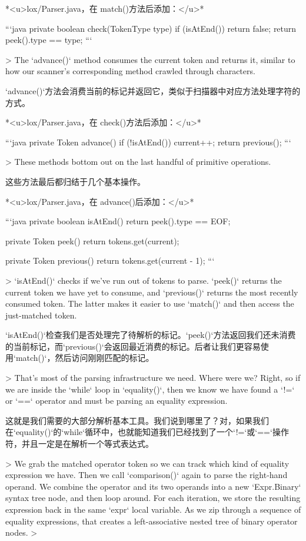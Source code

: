 \documentclass[cn,11pt,chinese]{elegantbook}
\begin{document}
*<u>lox/Parser.java，在 match()方法后添加：</u>*

```java
  private boolean check(TokenType type) {
    if (isAtEnd()) return false;
    return peek().type == type;
  }
```

> The `advance()` method consumes the current token and returns it, similar to how our scanner’s corresponding method crawled through characters.

`advance()`方法会消费当前的标记并返回它，类似于扫描器中对应方法处理字符的方式。

*<u>lox/Parser.java，在 check()方法后添加：</u>*

```java
  private Token advance() {
    if (!isAtEnd()) current++;
    return previous();
  }
```

> These methods bottom out on the last handful of primitive operations.

这些方法最后都归结于几个基本操作。

*<u>lox/Parser.java，在 advance()后添加：</u>*

```java
  private boolean isAtEnd() {
    return peek().type == EOF;
  }

  private Token peek() {
    return tokens.get(current);
  }

  private Token previous() {
    return tokens.get(current - 1);
  }
```

> `isAtEnd()` checks if we’ve run out of tokens to parse. `peek()` returns the current token we have yet to consume, and `previous()` returns the most recently consumed token. The latter makes it easier to use `match()` and then access the just-matched token.

`isAtEnd()`检查我们是否处理完了待解析的标记。`peek()`方法返回我们还未消费的当前标记，而`previous()`会返回最近消费的标记。后者让我们更容易使用`match()`，然后访问刚刚匹配的标记。

> That’s most of the parsing infrastructure we need. Where were we? Right, so if we are inside the `while` loop in `equality()`, then we know we have found a `!=` or `==` operator and must be parsing an equality expression.

这就是我们需要的大部分解析基本工具。我们说到哪里了？对，如果我们在`equality()`的`while`循环中，也就能知道我们已经找到了一个`!=`或`==`操作符，并且一定是在解析一个等式表达式。

> We grab the matched operator token so we can track which kind of equality expression we have. Then we call `comparison()` again to parse the right-hand operand. We combine the operator and its two operands into a new `Expr.Binary` syntax tree node, and then loop around. For each iteration, we store the resulting expression back in the same `expr` local variable. As we zip through a sequence of equality expressions, that creates a left-associative nested tree of binary operator nodes.
>
\end{document}
